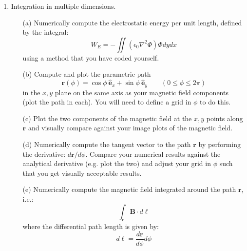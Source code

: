 \documentclass{article}
\begin{document}
\begin{enumerate}
\begin{itemize}
    
  \end{itemize}
  \item  Integration in multiple dimensions.  
  \begin{itemize}
    \item[(a)] Numerically compute the electrostatic energy per unit length, defined by the integral:  
    \begin{equation}
      W_E = - \iint \left( \epsilon_0 \nabla^2 \Phi \right) \Phi dy dx
    \end{equation}
    using a method that you have coded yourself.  
    \item[(b)]  Compute and plot the parametric path
    \begin{equation}
       \mathbf{r}(\phi) = \cos \phi ~ \hat{\mathbf{e}}_x + \sin \phi ~ \hat{\mathbf{e}}_y \qquad (0 \le \phi \le 2 \pi)
    \end{equation}    
    in the $x,y$ plane on the same axis as your magnetic field components (plot the path in each).  You will need to define a grid in $\phi$ to do this.
    \item[(c)]  Plot the two components of the magnetic field at the $x,y$ points along $\mathbf{r}$ and visually compare against your image plots of the magnetic field.  
    \item[(d)]  Numerically compute the tangent vector to the path $\mathbf{r}$ by performing the derivative:  $d \mathbf{r} / d \phi$.  Compare your numerical results against the analytical derivative (e.g. plot the two) and adjust your grid in $\phi$ such that you get visually acceptable results.  
    \item[(e)]  Numerically compute the magnetic field integrated around the path $\mathbf{r}$, i.e.:
    \begin{equation}
       \int_{\mathbf{r}} \mathbf{B} \cdot d \mathbf{\ell} 
    \end{equation}
    where the differential path length is given by:
    \begin{equation}
      d \ell = \frac{d \mathbf{r}}{d \phi} d \phi 
    \end{equation}    
  \end{itemize}
\end{enumerate}
\end{document}
